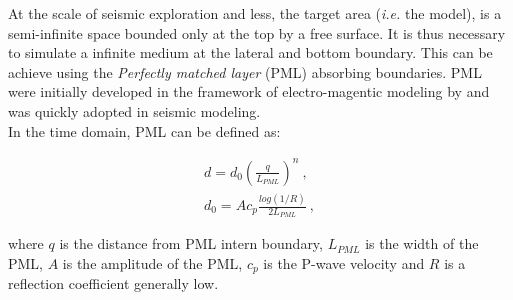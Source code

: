 \documentclass{gnulike}
\begin{document}
\noindent At the scale of seismic exploration and less, the target area (\textit{i.e.} the model), is a semi-infinite space bounded only at the top by a free surface. It is thus necessary to simulate a infinite medium at the lateral and bottom boundary. This can be achieve using the \textit{Perfectly matched layer} (PML) absorbing boundaries. PML were initially developed in the framework of electro-magentic modeling by \cite{berenger1994perfectly} and was quickly adopted in seismic modeling.\\

\noindent In the time domain, PML can be defined as:

\begin{eqnarray}
\label{eq:pml-equations}
d = d_{0} \left( \frac{q}{L_{PML}} \right) ^{n}\ , \\
d_{0} = Ac_{p} \frac{log(1/R)}{2L_{PML}}\ ,
\end{eqnarray}

\noindent where $q$ is the distance from PML intern boundary, $L_{PML}$ is the width of the PML, $A$ is the amplitude of the PML, $c_{p}$ is the P-wave velocity and $R$ is a reflection coefficient generally low.\\
\end{document}
